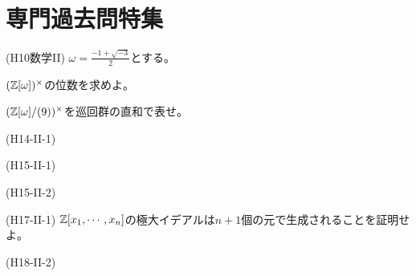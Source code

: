 \section{専門過去問特集}
\begin{prob} (H10数学II)
$\omega = \frac{-1+\sqrt{-3}}{2}$とする。
\ben
\item $(\mathbb{Z}[\omega])^{\times}$の位数を求めよ。
\item $(\mathbb{Z}[\omega]/(9))^{\times}$を巡回群の直和で表せ。
\een
\end{prob}
\begin{hint}
\end{hint}

\begin{prob} (H14-II-1)
\end{prob}

\begin{prob} (H15-II-1)
\end{prob}

\begin{prob} (H15-II-2)
\end{prob}

\begin{prob} (H17-II-1)
$\mathbb{Z}[x_1,\cdots, x_n]$の極大イデアルは$n+1$個の元で生成されることを証明せよ。

\end{prob}
\begin{hint}
\end{hint}

\begin{prob} (H18-II-2)
\end{prob}
